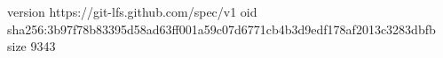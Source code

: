 version https://git-lfs.github.com/spec/v1
oid sha256:3b97f78b83395d58ad63ff001a59c07d6771cb4b3d9edf178af2013c3283dbfb
size 9343
